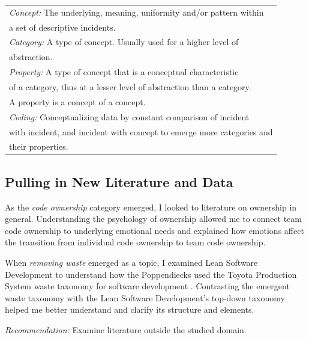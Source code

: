 \begin{table}[t]
\renewcommand{\arraystretch}{1.5}
\centering
\label{glaserDefinitions}
\begin{tabular}{|l|}
\hline
\textit{Concept:} The underlying, meaning, uniformity and/or pattern within \\ a set of descriptive incidents. \\ 
\textit{Category:} A type of concept. Usually used for a higher level of \\ abstraction. \\
\textit{Property:} A type of concept that is a conceptual characteristic \\ of a category, thus at a lesser level of abstraction than a category. \\ A property is a concept of a concept. \\ 
\textit{Coding:} Conceptualizing data by constant comparison of incident \\ with incident, and incident with concept to emerge more categories and \\ their properties.
\\ \hline
\end{tabular}
\end{table}


\subsection{Pulling in New Literature and Data}
As the \textit{code ownership} category emerged, I looked to literature on ownership in general. Understanding the psychology of ownership \cite{Pierce2001} allowed me to connect team code ownership to underlying emotional needs and explained how emotions affect the transition from individual code ownership to team code ownership.

When \textit{removing waste} emerged as a topic, I examined Lean Software Development to understand how the Poppendiecks used the Toyota Production System waste taxonomy for software development \cite{PoppendieckConceptToCash}. Contrasting the emergent waste taxonomy with the Lean Software Development's top-down taxonomy helped me better understand and clarify its structure and elements. 


\textit{Recommendation:} Examine literature outside the studied domain.

